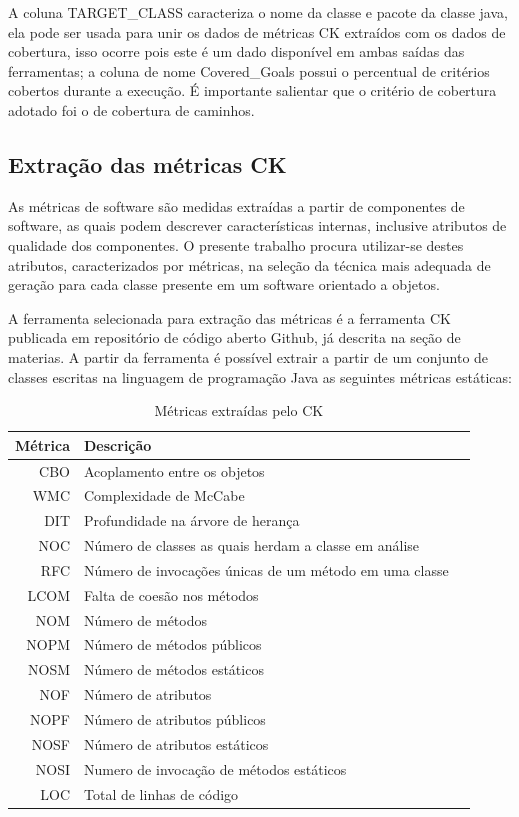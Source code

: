 \documentclass[
	12pt,				%
	oneside,			%
	a4paper,			%
	english,			%
	brazil				%
	]{abntex2ppgsi}
\begin{document}
A coluna TARGET\_CLASS caracteriza o nome da classe e pacote da classe java, ela pode ser usada para unir os dados de métricas CK extraídos com os dados de cobertura, isso ocorre pois este é um dado disponível em ambas saídas das ferramentas; a coluna de nome Covered\_Goals possui o percentual de critérios cobertos durante a execução. É importante salientar que o critério de cobertura adotado foi o de cobertura de caminhos.



\subsection{Extração das métricas CK}
As métricas de software são medidas extraídas a partir de componentes de software, as quais podem descrever características internas, inclusive atributos de qualidade dos componentes. O presente trabalho procura utilizar-se destes atributos, caracterizados por métricas, na seleção da técnica mais adequada de geração para cada classe presente em um software orientado a objetos.

A ferramenta selecionada para extração das métricas é a ferramenta CK publicada em repositório de código aberto Github, já descrita na seção de materias. A partir da ferramenta é possível extrair a partir de um conjunto de classes escritas na linguagem de programação Java as seguintes métricas estáticas:


\begin{table}[h]

\centering
\caption{Métricas extraídas pelo CK}
\vspace{0.5cm}
\begin{tabular}{r|lr}

Métrica  & Descrição \\ %
\hline                               %
CBO & Acoplamento entre os objetos \\
WMC & Complexidade de McCabe \\	  
DIT & Profundidade na árvore de herança \\	 
NOC & Número de classes as quais herdam a classe em análise \\   
RFC & Número de invocações únicas de um método em uma classe \\	 
LCOM & Falta de coesão nos métodos \\	
NOM & Número de métodos \\	 
NOPM & Número de métodos públicos	 \\ 
NOSM & Número de métodos estáticos \\	
NOF & Número de atributos\\	  
NOPF & Número de atributos públicos \\	
NOSF & Número de atributos estáticos \\	
NOSI & Numero de invocação de métodos estáticos  \\	
LOC & Total de linhas de código


\end{tabular}
\label{table:metricas-extraidas-ck}
\end{table}
\end{document}
